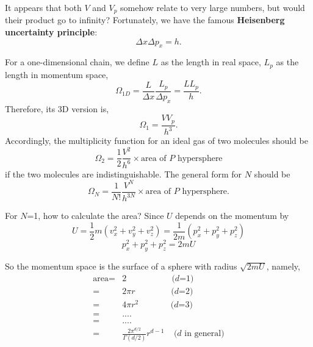 It appears that both $V$ and $V_p$ somehow relate to very large numbers, but would their product go to infinity? 
Fortunately, we have the famous {\bf Heisenberg uncertainty principle}:
\begin{equation} \Delta{x}\Delta{p_x} = h. \end{equation}

For a one-dimensional chain, we define $L$ as the length in real space, $L_p$ as the length in momentum space,
\begin{equation} \Omega_{1D} = \frac{L}{\Delta{x}} \frac{L_p}{\Delta{p_x}} = \frac{LL_p}{h}. \end{equation}
Therefore, its 3D version is,
\begin{equation} \Omega_1 = \frac{VV_p}{h^3}. \end{equation}
Accordingly, the multiplicity function for an ideal gas of two molecules should be
\begin{equation} 
\Omega_2 = \frac{1}{2}\frac{V^2}{h^6} \times \text{area of $P$ hypersphere}
\end{equation}
if the two molecules are indistinguishable.
The general form for $N$ should be 
\begin{equation} \Omega_N = \frac{1}{N!}\frac{V^N}{h^{3N}} \times \text{area of $P$ hypersphere}. \end{equation}

For $N$=1, how to calculate the area?
Since $U$ depends on the momentum by
\begin{equation}
U = \frac{1}{2}m(v_x^2+v_y^2+v_z^2)=\frac{1}{2m}(p_x^2+p_y^2+p_z^2)
\end{equation}
\begin{equation}
p_x^2+p_y^2+p_z^2 = 2mU
\end{equation}

So the momentum space is the surface of a sphere with radius $\sqrt{2mU}$, namely,
\begin{equation}
\begin{split}
\text{area} = & 2    ~~~~~~~~~~~~~~~~~~~~~~~~\text {($d$=1)}\\
            = & 2\pi r    ~~~~~~~~~~~~~~~~~~~\text {($d$=2)}\\
            = & 4\pi r^2    ~~~~~~~~~~~~~~~~~\text {($d$=3)}\\
            = & ....\\
            = & ....\\
            = & \frac{2\pi^{d/2}}{\Gamma(d/2)} r^{d-1} ~~~~~\text {($d$ in general)}\\
\end{split}
\end{equation}


